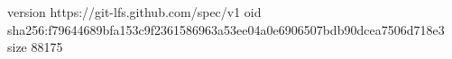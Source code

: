 version https://git-lfs.github.com/spec/v1
oid sha256:f79644689bfa153c9f2361586963a53ee04a0e6906507bdb90dcea7506d718e3
size 88175
